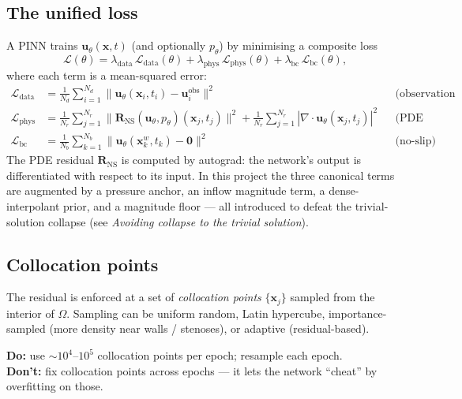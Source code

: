 \documentclass[11pt]{article}
\begin{document}
\subsection*{The unified loss}
A PINN trains $\mathbf{u}_\theta(\mathbf{x}, t)$ (and optionally $p_\theta$) by minimising a composite loss
\begin{equation}
\mathcal{L}(\theta) = \lambda_{\text{data}}\,\mathcal{L}_{\text{data}}(\theta) + \lambda_{\text{phys}}\,\mathcal{L}_{\text{phys}}(\theta) + \lambda_{\text{bc}}\,\mathcal{L}_{\text{bc}}(\theta),
\label{eq:PINNloss}
\end{equation}
where each term is a mean-squared error:
\begin{align*}
\mathcal{L}_{\text{data}} &= \frac{1}{N_d}\sum_{i=1}^{N_d}\|\mathbf{u}_\theta(\mathbf{x}_i, t_i) - \mathbf{u}_i^{\text{obs}}\|^2 && \text{(observation fit)}\\
\mathcal{L}_{\text{phys}} &= \frac{1}{N_r}\sum_{j=1}^{N_r}\|\mathbf{R}_{\text{NS}}(\mathbf{u}_\theta, p_\theta)(\mathbf{x}_j, t_j)\|^2 + \frac{1}{N_r}\sum_{j=1}^{N_r}|\nabla\cdot\mathbf{u}_\theta(\mathbf{x}_j,t_j)|^2 && \text{(PDE residual)}\\
\mathcal{L}_{\text{bc}} &= \frac{1}{N_b}\sum_{k=1}^{N_b}\|\mathbf{u}_\theta(\mathbf{x}_k^w, t_k) - \mathbf{0}\|^2 && \text{(no-slip)}
\end{align*}
The PDE residual $\mathbf{R}_{\text{NS}}$ is computed by autograd: the network's output is differentiated with respect to its input. In this project the three canonical terms are augmented by a pressure anchor, an inflow magnitude term, a dense-interpolant prior, and a magnitude floor --- all introduced to defeat the trivial-solution collapse (see \emph{Avoiding collapse to the trivial solution}).

\subsection*{Collocation points}
The residual is enforced at a set of \emph{collocation points} $\{\mathbf{x}_j\}$ sampled from the interior of $\Omega$. Sampling can be uniform random, Latin hypercube, importance-sampled (more density near walls / stenoses), or adaptive (residual-based).

\textbf{Do:} use $\sim 10^4$--$10^5$ collocation points per epoch; resample each epoch.\\
\textbf{Don't:} fix collocation points across epochs --- it lets the network ``cheat'' by overfitting on those.
\end{document}
